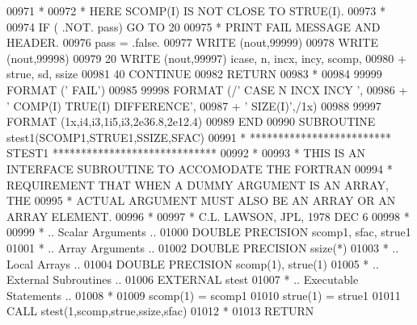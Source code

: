\begin{DoxyCode}
00971 \textcolor{comment}{*}
00972 \textcolor{comment}{*                             HERE    SCOMP(I) IS NOT CLOSE TO STRUE(I).}
00973 \textcolor{comment}{*}
00974          \textcolor{keywordflow}{IF} ( .NOT. pass) \textcolor{keywordflow}{GO TO} 20
00975 \textcolor{comment}{*                             PRINT FAIL MESSAGE AND HEADER.}
00976          pass = .false.
00977          \textcolor{keyword}{WRITE} (nout,99999)
00978          \textcolor{keyword}{WRITE} (nout,99998)
00979    20    \textcolor{keyword}{WRITE} (nout,99997) icase, n, incx, incy, scomp,
00980      +     strue, sd, ssize
00981    40 \textcolor{keywordflow}{CONTINUE}
00982       \textcolor{keywordflow}{RETURN}
00983 \textcolor{comment}{*}
00984 99999 \textcolor{keyword}{FORMAT} (\textcolor{stringliteral}{'                                       FAIL'})
00985 99998 \textcolor{keyword}{FORMAT} (/\textcolor{stringliteral}{' CASE  N INCX INCY                           '},
00986      +       \textcolor{stringliteral}{' COMP(I)                             TRUE(I)  DIFFERENCE'},
00987      +       \textcolor{stringliteral}{'     SIZE(I)'},/1x)
00988 99997 \textcolor{keyword}{FORMAT} (1x,i4,i3,1i5,i3,2e36.8,2e12.4)
00989 \textcolor{keyword}{      END}
00990 \textcolor{keyword}{      SUBROUTINE }stest1(SCOMP1,STRUE1,SSIZE,SFAC)
00991 \textcolor{comment}{*     ************************* STEST1 *****************************}
00992 \textcolor{comment}{*}
00993 \textcolor{comment}{*     THIS IS AN INTERFACE SUBROUTINE TO ACCOMODATE THE FORTRAN}
00994 \textcolor{comment}{*     REQUIREMENT THAT WHEN A DUMMY ARGUMENT IS AN ARRAY, THE}
00995 \textcolor{comment}{*     ACTUAL ARGUMENT MUST ALSO BE AN ARRAY OR AN ARRAY ELEMENT.}
00996 \textcolor{comment}{*}
00997 \textcolor{comment}{*     C.L. LAWSON, JPL, 1978 DEC 6}
00998 \textcolor{comment}{*}
00999 \textcolor{comment}{*     .. Scalar Arguments ..}
01000       \textcolor{keywordtype}{DOUBLE PRECISION}  scomp1, sfac, strue1
01001 \textcolor{comment}{*     .. Array Arguments ..}
01002       \textcolor{keywordtype}{DOUBLE PRECISION}  ssize(*)
01003 \textcolor{comment}{*     .. Local Arrays ..}
01004       \textcolor{keywordtype}{DOUBLE PRECISION}  scomp(1), strue(1)
01005 \textcolor{comment}{*     .. External Subroutines ..}
01006       \textcolor{keywordtype}{EXTERNAL}          stest
01007 \textcolor{comment}{*     .. Executable Statements ..}
01008 \textcolor{comment}{*}
01009       scomp(1) = scomp1
01010       strue(1) = strue1
01011       \textcolor{keyword}{CALL }stest(1,scomp,strue,ssize,sfac)
01012 \textcolor{comment}{*}
01013       \textcolor{keywordflow}{RETURN}

\end{DoxyCode}
